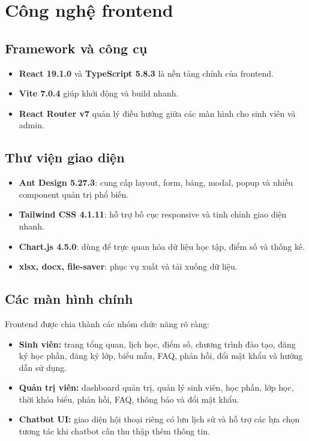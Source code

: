 \documentclass[12pt,a4paper]{report}
\begin{document}
\section{Công nghệ frontend}
\subsection{Framework và công cụ}
\begin{itemize}
    \item \textbf{React 19.1.0} và \textbf{TypeScript 5.8.3} là nền tảng chính của frontend.
    \item \textbf{Vite 7.0.4} giúp khởi động và build nhanh.
    \item \textbf{React Router v7} quản lý điều hướng giữa các màn hình cho sinh viên và admin.
\end{itemize}

\subsection{Thư viện giao diện}
\begin{itemize}
    \item \textbf{Ant Design 5.27.3}: cung cấp layout, form, bảng, modal, popup và nhiều component quản trị phổ biến.
    \item \textbf{Tailwind CSS 4.1.11}: hỗ trợ bố cục responsive và tinh chỉnh giao diện nhanh.
    \item \textbf{Chart.js 4.5.0}: dùng để trực quan hóa dữ liệu học tập, điểm số và thống kê.
    \item \textbf{xlsx, docx, file-saver}: phục vụ xuất và tải xuống dữ liệu.
\end{itemize}

\subsection{Các màn hình chính}
Frontend được chia thành các nhóm chức năng rõ ràng:
\begin{itemize}
    \item \textbf{Sinh viên:} trang tổng quan, lịch học, điểm số, chương trình đào tạo, đăng ký học phần, đăng ký lớp, biểu mẫu, FAQ, phản hồi, đổi mật khẩu và hướng dẫn sử dụng.
    \item \textbf{Quản trị viên:} dashboard quản trị, quản lý sinh viên, học phần, lớp học, thời khóa biểu, phản hồi, FAQ, thông báo và đổi mật khẩu.
    \item \textbf{Chatbot UI:} giao diện hội thoại riêng có lưu lịch sử và hỗ trợ các lựa chọn tương tác khi chatbot cần thu thập thêm thông tin.
\end{itemize}
\end{document}
